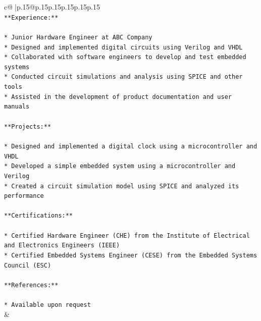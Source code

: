 \documentclass{article}
\begin{document}
{\begin{supertabular}{c@{$\;$}|p{.15\linewidth}@{}p{.15\linewidth}p{.15\linewidth}p{.15\linewidth}p{.15\linewidth}p{.15\linewidth}}
{{{\\ 
\texttt{**Experience:**} \\
\\ 
\texttt{* Junior Hardware Engineer at ABC Company} \\
\texttt{* Designed and implemented digital circuits using Verilog and VHDL} \\
\texttt{* Collaborated with software engineers to develop and test embedded systems} \\
\texttt{* Conducted circuit simulations and analysis using SPICE and other tools} \\
\texttt{* Assisted in the development of product documentation and user manuals} \\
\\ 
\texttt{**Projects:**} \\
\\ 
\texttt{* Designed and implemented a digital clock using a microcontroller and VHDL} \\
\texttt{* Developed a simple embedded system using a microcontroller and Verilog} \\
\texttt{* Created a circuit simulation model using SPICE and analyzed its performance} \\
\\ 
\texttt{**Certifications:**} \\
\\ 
\texttt{* Certified Hardware Engineer (CHE) from the Institute of Electrical and Electronics Engineers (IEEE)} \\
\texttt{* Certified Embedded Systems Engineer (CESE) from the Embedded Systems Council (ESC)} \\
\\ 
\texttt{**References:**} \\
\\ 
\texttt{* Available upon request} \\
            }
        }
    }
    & \\ \\


\end{supertabular}}
\end{document}
